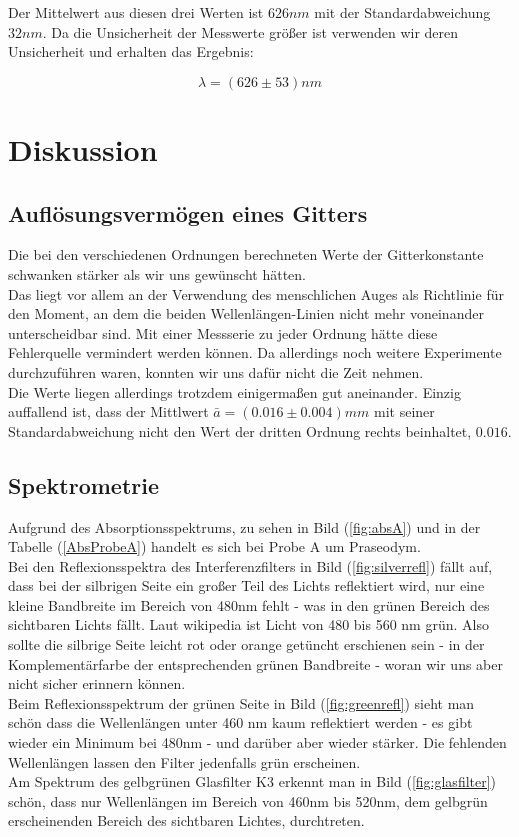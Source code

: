 \documentclass{article}
\begin{document}
Der Mittelwert aus diesen drei Werten ist $626nm$ mit der Standardabweichung $32nm$. Da die Unsicherheit der Messwerte größer ist verwenden wir deren Unsicherheit und erhalten das Ergebnis:

$$\boxed{\lambda=(626 \pm 53)nm}$$

\section{Diskussion}
\subsection{Auflösungsvermögen eines Gitters}
Die bei den verschiedenen Ordnungen berechneten Werte der Gitterkonstante schwanken stärker als wir uns gewünscht hätten.\\
Das liegt vor allem an der Verwendung des menschlichen Auges als Richtlinie für den Moment, an dem die beiden Wellenlängen-Linien nicht mehr voneinander unterscheidbar sind. Mit einer Messserie zu jeder Ordnung hätte diese Fehlerquelle vermindert werden können. Da allerdings noch weitere Experimente durchzuführen waren, konnten wir uns dafür nicht die Zeit nehmen.\\
Die Werte liegen allerdings trotzdem einigermaßen gut aneinander. Einzig auffallend ist, dass der Mittlwert $\bar{a}=(0.016 \pm 0.004)mm$ mit seiner Standardabweichung nicht den Wert der dritten Ordnung rechts beinhaltet, $0.016$.

\subsection{Spektrometrie}

Aufgrund des Absorptionsspektrums, zu sehen in Bild (\ref{fig:absA}) und in der Tabelle (\ref{AbsProbeA}) handelt es sich bei Probe A um Praseodym. \\

Bei den Reflexionsspektra des Interferenzfilters in Bild (\ref{fig:silverrefl}) fällt auf, dass bei der silbrigen Seite ein großer Teil des Lichts reflektiert wird, nur eine kleine Bandbreite im Bereich von 480nm fehlt - was in den grünen Bereich des sichtbaren Lichts fällt. Laut wikipedia ist Licht von 480 bis 560 nm grün. Also sollte die silbrige Seite leicht rot oder orange getüncht erschienen sein - in der Komplementärfarbe der entsprechenden grünen Bandbreite - woran wir uns aber nicht sicher erinnern können. \\
Beim Reflexionsspektrum der grünen Seite in Bild (\ref{fig:greenrefl}) sieht man schön dass die Wellenlängen unter 460 nm kaum reflektiert werden - es gibt wieder ein Minimum bei 480nm - und darüber aber wieder stärker. Die fehlenden Wellenlängen lassen den Filter jedenfalls grün erscheinen.\\
Am Spektrum des gelbgrünen Glasfilter K3 erkennt man in Bild (\ref{fig:glasfilter}) schön, dass nur Wellenlängen im Bereich von 460nm bis 520nm, dem gelbgrün erscheinenden Bereich des sichtbaren Lichtes, durchtreten.
\end{document}

